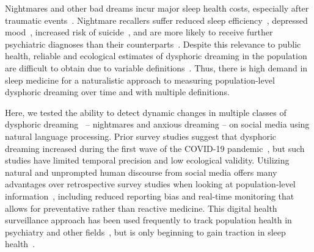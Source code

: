 \documentclass[11pt,a4paper,twocolumn]{article}
\begin{document}
Nightmares and other bad dreams incur major sleep health costs, especially after traumatic events~\supercite{lavie2001disturbances}. Nightmare recallers suffer reduced sleep efficiency~\supercite{simor2012disturbed}, depressed mood~\supercite{blagrove2004relationship}, increased risk of suicide~\supercite{que2022nightmares}, and are more likely to receive further psychiatric diagnoses than their counterparts~\supercite{wong2023prevalence,otaiku2023distressing,mendoza2025systematic}. Despite this relevance to public health, reliable and ecological estimates of dysphoric dreaming in the population are difficult to obtain due to variable definitions~\supercite{worley2021epidemiology}. Thus, there is high demand in sleep medicine for a naturalistic approach to measuring population-level dysphoric dreaming over time and with multiple definitions.

\par
Here, we tested the ability to detect dynamic changes in multiple classes of dysphoric dreaming~\supercite{siclari2020dreams} -- nightmares and anxious dreaming -- on social media using natural language processing. Prior survey studies suggest that dysphoric dreaming increased during the first wave of the COVID-19 pandemic~\supercite{solomonova2021stuck}, but such studies have limited temporal precision and low ecological validity. Utilizing natural and unprompted human discourse from social media offers many advantages over retrospective survey studies when looking at population-level information~\supercite{lazer2021meaningful}, including reduced reporting bias and real-time monitoring that allows for preventative rather than reactive medicine. This digital health surveillance approach has been used frequently to track population health in psychiatry and other fields~\supercite{shakeri2021digital}, but is only beginning to gain traction in sleep health~\supercite{mciver2015characterizing,leypunskiy2018geographically}.
\end{document}
